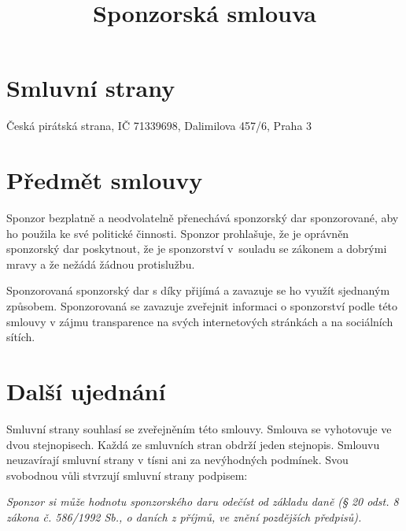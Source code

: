 \documentclass[11pt,a4paper,czech]{article}
\begin{document}
\title{Sponzorská smlouva}

\begin{Form}

\section{Smluvní strany}

{
     \hfill{} 
   

}

{
   Česká pirátská strana, IČ 71339698, Dalimilova 457/6, Praha 3
   
}

\section{Předmět smlouvy}

Sponzor bezplatně a neodvolatelně přenechává sponzorský dar sponzorované, aby ho použila ke své politické činnosti. Sponzor prohlašuje, že je oprávněn sponzorský dar poskytnout, že je sponzorství v~souladu se zákonem a dobrými mravy a že nežádá žádnou protislužbu. 

Sponzorovaná sponzorský dar s díky přijímá a zavazuje se ho využít sjednaným způsobem. Sponzorovaná se zavazuje zveřejnit informaci o sponzorství podle této smlouvy v zájmu transparence na svých internetových stránkách a na sociálních sítích.


\section{Další ujednání}

Smluvní strany souhlasí se zveřejněním této smlouvy. Smlouva se vyhotovuje ve dvou stejnopisech. Každá ze smluvních stran obdrží jeden stejnopis. Smlouvu neuzavírají smluvní strany v tísni ani za nevýhodných podmínek. Svou svobodnou vůli stvrzují smluvní strany podpisem:

 

\end{Form}


\emph{Sponzor si může hodnotu sponzorského daru odečíst od základu daně (§ 20 odst. 8 zákona č. 586/1992 Sb., o daních z příjmů, ve znění pozdějších předpisů).}

\hypersetup{pdfborder=0 0 0}
\end{document}
